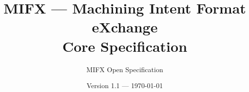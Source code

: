 \title{%
MIFX — Machining Intent Format eXchange\\
\large Core Specification
}

\author{MIFX Open Specification}

\date{Version 1.1 — \today}
